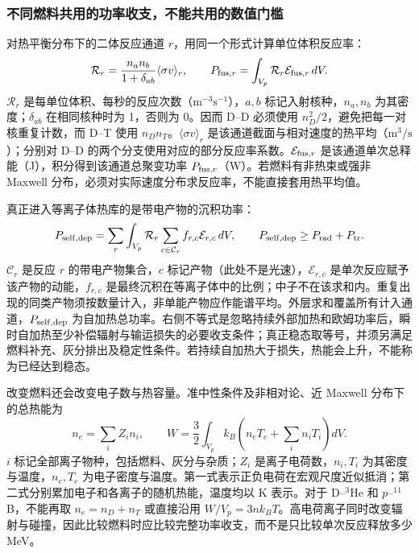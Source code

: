 \documentclass[12pt,fontset=none]{ctexart}
\numberwithin{equation}{section}
\numberwithin{table}{section}
\numberwithin{figure}{section}
\begin{document}
\subsubsection{不同燃料共用的功率收支，不能共用的数值门槛}

对热平衡分布下的二体反应通道 $r$，用同一个形式计算单位体积反应率：
\begin{equation}\label{eq:cycle-general-rate}
 \mathcal R_r=\frac{n_a n_b}{1+\delta_{ab}}\langle\sigma v\rangle_r,
 \qquad
 P_{{\rm fus},r}=\int_{V_p}\mathcal R_r\mathcal E_{{\rm fus},r}\,dV.
\end{equation}
$\mathcal R_r$ 是每单位体积、每秒的反应次数（$\mathrm{m^{-3}s^{-1}}$），$a,b$ 标记入射核种，$n_a,n_b$ 为其密度；$\delta_{ab}$ 在相同核种时为 1，否则为 0。因而 D--D 必须使用 $n_D^2/2$，避免把每一对核重复计数，而 D--T 使用 $n_Dn_T$。$\langle\sigma v\rangle_r$ 是该通道截面与相对速度的热平均（$\mathrm{m^3/s}$）；分别对 D--D 的两个分支使用对应的部分反应率系数。$\mathcal E_{{\rm fus},r}$ 是该通道单次总释能（J），积分得到该通道总聚变功率 $P_{{\rm fus},r}$（W）。若燃料有非热束或强非 Maxwell 分布，必须对实际速度分布求反应率，不能直接套用热平均值。

真正进入等离子体热库的是带电产物的沉积功率：
\begin{equation}\label{eq:cycle-general-selfheat}
 P_{\rm self,dep}=\sum_r\int_{V_p}\mathcal R_r
 \sum_{c\in\mathcal C_r}f_{r,c}\mathcal E_{r,c}\,dV,
 \qquad P_{\rm self,dep}\geq P_{\rm rad}+P_{\rm tr}.
\end{equation}
$\mathcal C_r$ 是反应 $r$ 的带电产物集合，$c$ 标记产物（此处不是光速），$\mathcal E_{r,c}$ 是单次反应赋予该产物的动能，$f_{r,c}$ 是最终沉积在等离子体中的比例；中子不在该求和内。重复出现的同类产物须按数量计入，非单能产物应作能谱平均。外层求和覆盖所有计入通道，$P_{\rm self,dep}$ 为自加热总功率。右侧不等式是忽略持续外部加热和欧姆功率后，瞬时自加热至少补偿辐射与输运损失的必要收支条件；真正稳态取等号，并须另满足燃料补充、灰分排出及稳定性条件。若持续自加热大于损失，热能会上升，不能称为已经达到稳态。

改变燃料还会改变电子数与热容量。准中性条件及非相对论、近 Maxwell 分布下的总热能为
\begin{equation}\label{eq:cycle-multifuel-energy}
 n_e=\sum_i Z_i n_i,
 \qquad W=\frac32\int_{V_p}k_B\left(n_eT_e+\sum_i n_iT_i\right)dV.
\end{equation}
$i$ 标记全部离子物种，包括燃料、灰分与杂质；$Z_i$ 是离子电荷数，$n_i,T_i$ 为其密度与温度，$n_e,T_e$ 为电子密度与温度。第一式表示正负电荷在宏观尺度近似抵消；第二式分别累加电子和各离子的随机热能，温度均以 K 表示。对于 D--${}^3$He 和 $p$--${}^{11}$B，不能再取 $n_e=n_D+n_T$ 或直接沿用 $W/V_p=3nk_BT$。高电荷离子同时改变辐射与碰撞，因此比较燃料时应比较完整功率收支，而不是只比较单次反应释放多少 MeV。
\end{document}

